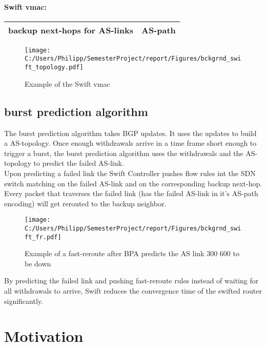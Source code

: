 \paragraph{\label{chapter2:Swift:Swift vmac}Swift vmac:}

\begin{tabular}{|r|l|}
  \hline 
  backup next-hops for AS-links & AS-path \\
  \hline
\end{tabular}


\begin{figure}[h]
\center
\texttt{[image: C:/Users/Philipp/SemesterProject/report/Figures/bckgrnd\_swift\_topology.pdf]}
\caption{Example of the Swift vmac}
\end{figure}


\subsection{\label{chapter2:Swift:burst prediciton algorithm}burst prediction algorithm}
The burst prediction algorithm takes BGP updates. It uses the updates to build a AS-topology. Once enough withdrawals arrive in a time frame short enough to trigger a burst, the burst prediction algorithm uses the withdrawals and the AS-topology to predict the failed AS-link. \\
Upon predicting a failed link the Swift Controller pushes flow rules int the SDN switch matching on the failed AS-link and on the corresponding backup next-hop. \\
Every packet that traverses the failed link (has the failed AS-link in it's AS-path encoding) will get rerouted to the backup neighbor.
\begin{figure}[h]
\center
\texttt{[image: C:/Users/Philipp/SemesterProject/report/Figures/bckgrnd\_swift\_fr.pdf]}
\caption{Example of a fast-reroute after BPA predicts the AS link 300 600 to be down}
\end{figure}

By predicting the failed link and pushing fast-reroute rules instead of waiting for all withdrawals to arrive, Swift reduces the convergence time of the swifted router significantly.


\section{\label{chapter2:Motivation}Motivation}

